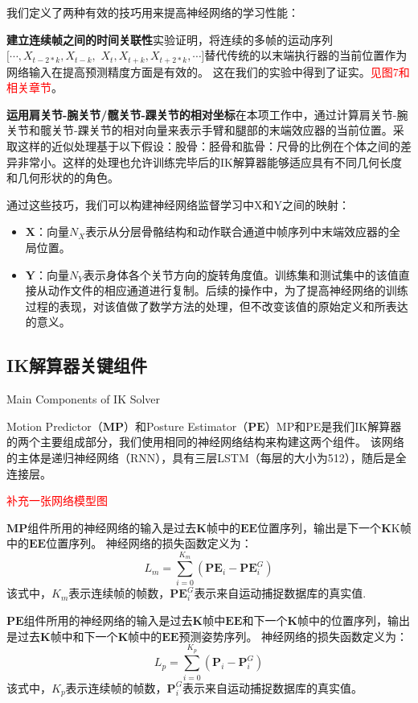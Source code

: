 我们定义了两种有效的技巧用来提高神经网络的学习性能：

\textbf{建立连续帧之间的时间关联性}实验证明，将连续的多帧的运动序列$[\cdots, X_{t-2*k}, X_{t-k},$ $ X_{t}, X_{t+k}, X_{t+2*k},\cdots]$替代传统的以末端执行器的当前位置作为网络输入在提高预测精度方面是有效的。 这在我们的实验中得到了证实。\textcolor{red}{见图7和相关章节}。

\textbf{运用肩关节-腕关节/髋关节-踝关节的相对坐标}在本项工作中，通过计算肩关节-腕关节和髋关节-踝关节的相对向量来表示手臂和腿部的末端效应器的当前位置。采取这样的近似处理基于以下假设：股骨：胫骨和肱骨：尺骨的比例在个体之间的差异非常小。这样的处理也允许训练完毕后的IK解算器能够适应具有不同几何长度和几何形状的的角色。

通过这些技巧，我们可以构建神经网络监督学习中\*X和\*Y之间的映射：

\begin{itemize}
\item $\mathbf{X}$：向量$N_X$表示从分层骨骼结构和动作联合通道中帧序列中末端效应器的全局位置。
\item $\mathbf{Y}$：向量$N_Y$表示身体各个关节方向的旋转角度值。训练集和测试集中的该值直接从动作文件的相应通道进行复制。后续的操作中，为了提高神经网络的训练过程的表现，对该值做了数学方法的处理，但不改变该值的原始定义和所表达的意义。
\end{itemize}

\subsection{IK解算器关键组件}{Main Components of IK Solver}

Motion Predictor（$\mathbf{MP}$）和Posture Estimator（$\mathbf{PE}$）MP和PE是我们IK解算器的两个主要组成部分，我们使用相同的神经网络结构来构建这两个组件。 该网络的主体是递归神经网络（RNN），具有三层LSTM（每层的大小为512），随后是全连接层。

\textcolor{red}{补充一张网络模型图}

$\mathbf{MP}$组件所用的神经网络的输入是过去$\mathbf{K}$帧中的$\mathbf{EE}$位置序列，输出是下一个$\mathbf{K}$K帧中的$\mathbf{EE}$位置序列。 神经网络的损失函数定义为：
\begin{equation}
L_m = \sum_{i=0}^{K_m} (\mathbf{PE}_i - \mathbf{PE}_i^G)
\end{equation}
该式中，$K_m$表示连续帧的帧数，$\mathbf{PE}_i^G$表示来自运动捕捉数据库的真实值.

$\mathbf{PE}$组件所用的神经网络的输入是过去$\mathbf{K}$帧中$\mathbf{EE}$和下一个$\mathbf{K}$帧中的位置序列，输出是过去$\mathbf{K}$帧中和下一个$\mathbf{K}$帧中的$\mathbf{EE}$预测姿势序列。 神经网络的损失函数定义为：
\begin{equation}
L_p = \sum_{i=0}^{K_p} (\mathbf{P}_i - \mathbf{P}_i^G)
\end{equation}
该式中，$K_p$表示连续帧的帧数，$\mathbf{P}_i^G$表示来自运动捕捉数据库的真实值。

